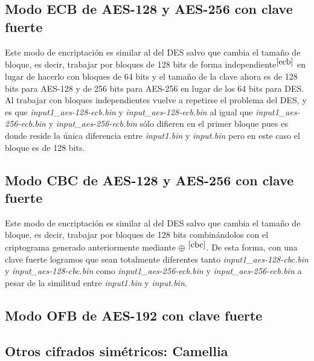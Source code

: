 \documentclass[a4paper, 11pt]{article}
\begin{document}
	\subsection{Modo ECB de AES-128 y AES-256 con clave fuerte}
		Este modo de encriptación es similar al del DES salvo que cambia el tamaño de bloque, es decir, trabajar por bloques
		de 128 bits de forma independiente$^{\ref{ecb}}$ en lugar de hacerlo con bloques de 64 bits y el tamaño de la clave ahora es de
		128 bits para AES-128 y de 256 bits para AES-256 en lugar de los 64 bits para DES. Al trabajar con bloques independientes
		vuelve a repetirse el problema del DES, y es que \textit{input1\_aes-128-ecb.bin} y \textit{input\_aes-128-ecb.bin}
		al igual que \textit{input1\_aes-256-ecb.bin} y \textit{input\_aes-256-ecb.bin} sólo difieren en el primer bloque
		pues es donde reside la única diferencia entre \textit{input1.bin} y \textit{input.bin} pero en este caso el bloque
		es de 128 bits.
		
	\subsection{Modo CBC de AES-128 y AES-256 con clave fuerte}
		Este modo de encriptación es similar al del DES salvo que cambia el tamaño de bloque, es decir, trabajar por bloques
		de 128 bits combinándolos con el criptograma generado anteriormente mediante $\oplus$ $^{\ref{cbc}}$. De esta forma, con una clave
		fuerte logramos que sean totalmente diferentes tanto \textit{input1\_aes-128-cbc.bin} y \textit{input\_aes-128-cbc.bin}
		como \textit{input1\_aes-256-ecb.bin} y \textit{input\_aes-256-ecb.bin} a pesar de la similitud entre \textit{input1.bin}
		y \textit{input.bin}.
		
	\subsection{Modo OFB de AES-192 con clave fuerte}
		
		
	\subsection{Otros cifrados simétricos: Camellia}
		
	
\end{document}
